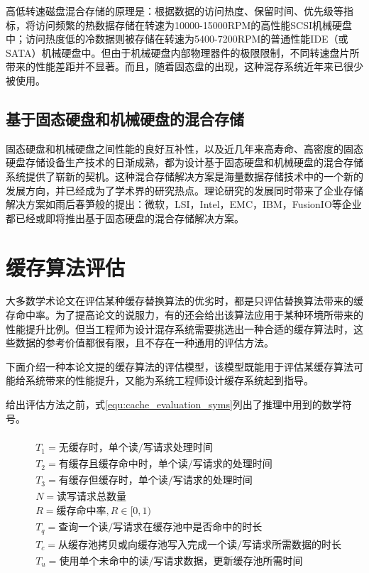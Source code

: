 高低转速磁盘混合存储的原理是：根据数据的访问热度、保留时间、优先级等指标，将访问频繁的热数据存储在转速为10000-15000RPM的高性能SCSI机械硬盘中；访问热度低的冷数据则被存储在转速为5400-7200RPM的普通性能IDE（或SATA）机械硬盘中。但由于机械硬盘内部物理器件的极限限制，不同转速盘片所带来的性能差距并不显著。而且，随着固态盘的出现，这种混存系统近年来已很少被使用。

\subsection{基于固态硬盘和机械硬盘的混合存储}

固态硬盘和机械硬盘之间性能的良好互补性，以及近几年来高寿命、高密度的固态硬盘存储设备生产技术的日渐成熟，都为设计基于固态硬盘和机械硬盘的混合存储系统提供了崭新的契机。这种混合存储解决方案是海量数据存储技术中的一个新的发展方向，并已经成为了学术界的研究热点。理论研究的发展同时带来了企业存储解决方案如雨后春笋般的提出：微软，LSI，Intel，EMC，IBM，FusionIO等企业都已经或即将推出基于固态硬盘的混合存储解决方案。

\section{缓存算法评估}
\label{sec:cache_evaluation}

大多数学术论文在评估某种缓存替换算法的优劣时，都是只评估替换算法带来的缓存命中率。为了提高论文的说服力，有的还会给出该算法应用于某种环境所带来的性能提升比例。但当工程师为设计混存系统需要挑选出一种合适的缓存算法时，这些数据的参考价值都很有限，且不存在一种通用的评估方法。

下面介绍一种本论文提的缓存算法的评估模型，该模型既能用于评估某缓存算法可能给系统带来的性能提升，又能为系统工程师设计缓存系统起到指导。

给出评估方法之前，式\ref{equ:cache_evaluation_syms}列出了推理中用到的数学符号。

\begin{equation}
\begin{split}
\\&T_1=\mbox{无缓存时，单个读/写请求处理时间}
\\&T_2=\mbox{有缓存且缓存命中时，单个读/写请求的处理时间}
\\&T_3=\mbox{有缓存但缓存时，单个读/写请求的处理时间}
\\&N=\mbox{读写请求总数量}
\\&R=\mbox{缓存命中率},R\in\lbrack0,1)
\\&T_q=\mbox{查询一个读/写请求在缓存池中是否命中的时长}
\\&T_c=\mbox{从缓存池拷贝或向缓存池写入完成一个读/写请求所需数据的时长}
\\&T_u=\mbox{使用单个未命中的读/写请求数据，更新缓存池所需时间}
\end{split}
\label{equ:cache_evaluation_syms}
\end{equation}

